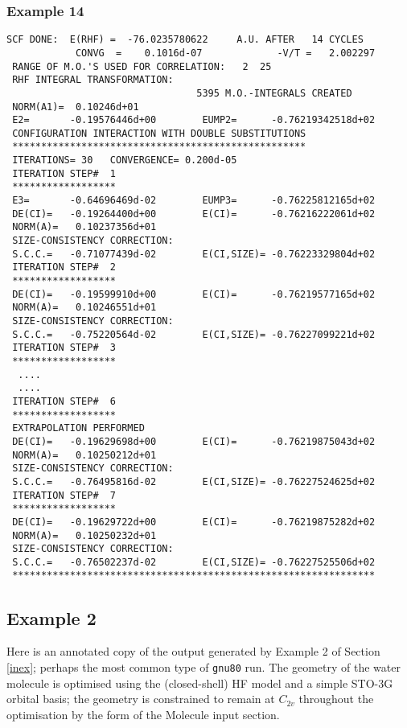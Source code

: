 \subsubsection{\sf Example 14}
{\small
\begin{verbatim}
SCF DONE:  E(RHF) =  -76.0235780622     A.U. AFTER   14 CYCLES
            CONVG  =    0.1016d-07             -V/T =   2.002297
 RANGE OF M.O.'S USED FOR CORRELATION:   2  25
 RHF INTEGRAL TRANSFORMATION:
                                 5395 M.O.-INTEGRALS CREATED
 NORM(A1)=  0.10246d+01
 E2=       -0.19576446d+00        EUMP2=      -0.76219342518d+02
 CONFIGURATION INTERACTION WITH DOUBLE SUBSTITUTIONS
 ***************************************************
 ITERATIONS= 30   CONVERGENCE= 0.200d-05
 ITERATION STEP#  1
 ******************
 E3=       -0.64696469d-02        EUMP3=      -0.76225812165d+02
 DE(CI)=   -0.19264400d+00        E(CI)=      -0.76216222061d+02
 NORM(A)=   0.10237356d+01
 SIZE-CONSISTENCY CORRECTION: 
 S.C.C.=   -0.71077439d-02        E(CI,SIZE)= -0.76223329804d+02
 ITERATION STEP#  2
 ******************
 DE(CI)=   -0.19599910d+00        E(CI)=      -0.76219577165d+02
 NORM(A)=   0.10246551d+01
 SIZE-CONSISTENCY CORRECTION: 
 S.C.C.=   -0.75220564d-02        E(CI,SIZE)= -0.76227099221d+02
 ITERATION STEP#  3
 ******************
  ....
  ....
 ITERATION STEP#  6
 ******************
 EXTRAPOLATION PERFORMED
 DE(CI)=   -0.19629698d+00        E(CI)=      -0.76219875043d+02
 NORM(A)=   0.10250212d+01
 SIZE-CONSISTENCY CORRECTION: 
 S.C.C.=   -0.76495816d-02        E(CI,SIZE)= -0.76227524625d+02
 ITERATION STEP#  7
 ******************
 DE(CI)=   -0.19629722d+00        E(CI)=      -0.76219875282d+02
 NORM(A)=   0.10250232d+01
 SIZE-CONSISTENCY CORRECTION: 
 S.C.C.=   -0.76502237d-02        E(CI,SIZE)= -0.76227525506d+02
 ***************************************************************
\end{verbatim}
}
\newpage
\subsection{\sf Example 2}
Here is an annotated copy of the output
generated by Example 2 of   Section \ref{inex};
perhaps the most common type of {\tt gnu80} run.
The geometry of the water molecule is optimised using
the (closed-shell) HF model and a simple STO-3G
orbital basis; the geometry is constrained to remain at
$C_{2v}$ throughout the optimisation
by the form of the Molecule input section.

